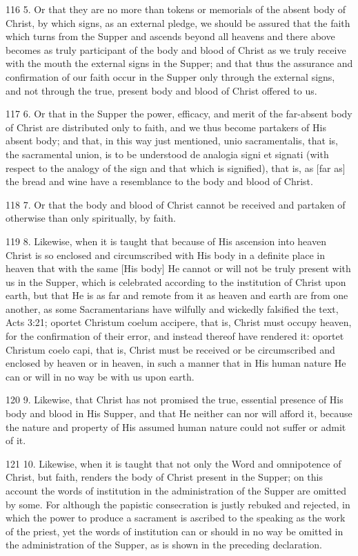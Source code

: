 116 5. Or that they are no more than tokens or memorials of the absent body of Christ, by which signs, as an external pledge, we should be assured that the faith which turns from the Supper and ascends beyond all heavens and there above becomes as truly participant of the body and blood of Christ as we truly receive with the mouth the external signs in the Supper; and that thus the assurance and confirmation of our faith occur in the Supper only through the external signs, and not through the true, present body and blood of Christ offered to us.

117 6. Or that in the Supper the power, efficacy, and merit of the far-absent body of Christ are distributed only to faith, and we thus become partakers of His absent body; and that, in this way just mentioned, unio sacramentalis, that is, the sacramental union, is to be understood de analogia signi et signati (with respect to the analogy of the sign and that which is signified), that is, as [far as] the bread and wine have a resemblance to the body and blood of Christ.

118 7. Or that the body and blood of Christ cannot be received and partaken of otherwise than only spiritually, by faith.

119 8. Likewise, when it is taught that because of His ascension into heaven Christ is so enclosed and circumscribed with His body in a definite place in heaven that with the same [His body] He cannot or will not be truly present with us in the Supper, which is celebrated according to the institution of Christ upon earth, but that He is as far and remote from it as heaven and earth are from one another, as some Sacramentarians have wilfully and wickedly falsified the text, Acts 3:21; oportet Christum coelum accipere, that is, Christ must occupy heaven, for the confirmation of their error, and instead thereof have rendered it: oportet Christum coelo capi, that is, Christ must be received or be circumscribed and enclosed by heaven or in heaven, in such a manner that in His human nature He can or will in no way be with us upon earth.

120 9. Likewise, that Christ has not promised the true, essential presence of His body and blood in His Supper, and that He neither can nor will afford it, because the nature and property of His assumed human nature could not suffer or admit of it.

121 10. Likewise, when it is taught that not only the Word and omnipotence of Christ, but faith, renders the body of Christ present in the Supper; on this account the words of institution in the administration of the Supper are omitted by some. For although the papistic consecration is justly rebuked and rejected, in which the power to produce a sacrament is ascribed to the speaking as the work of the priest, yet the words of institution can or should in no way be omitted in the administration of the Supper, as is shown in the preceding declaration.

